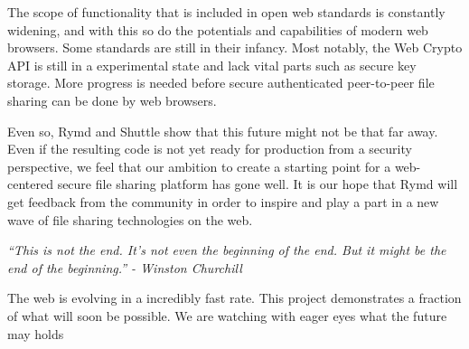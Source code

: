 The scope of functionality that is included in open web standards is constantly widening, and with this so do the potentials and capabilities of modern web browsers. Some standards are still in their infancy. Most notably, the Web Crypto API is still in a experimental state and lack vital parts such as secure key storage. More progress is needed before secure authenticated peer-to-peer file sharing can be done by web browsers.

Even so, Rymd and Shuttle show that this future might not be that far away. Even if the resulting code is not yet ready for production from a security perspective, we feel that our ambition to create a starting point for a web-centered secure file sharing platform has gone well. It is our hope that Rymd will get feedback from the community in order to inspire and play a part in a new wave of file sharing technologies on the web.


\emph{``This is not the end. It's not even the beginning of the end. But it might be the end of the beginning.'' - Winston Churchill}

The web is evolving in a incredibly fast rate. This project demonstrates a fraction of what will soon be possible. We are watching with eager eyes what the future may holds

